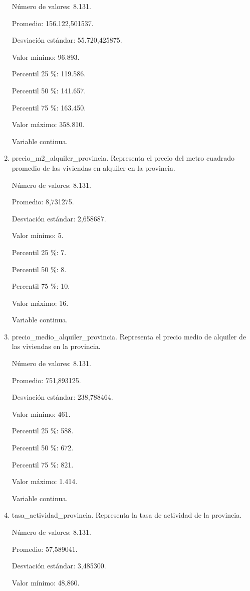 \begin{enumerate}
	Número de valores: 8.131.
	
	Promedio: 156.122,501537.
	
	Desviación estándar: 55.720,425875.
	
	Valor mínimo: 96.893.
	
	Percentil 25 \%: 119.586.
	
	Percentil 50 \%: 141.657.
	
	Percentil 75 \%: 163.450.
	
	Valor máximo: 358.810.
	
	Variable continua.

	\item precio\_m2\_alquiler\_provincia. Representa el precio del metro cuadrado promedio de las viviendas en alquiler en la provincia.
	
	Número de valores: 8.131.
	
	Promedio: 8,731275.
	
	Desviación estándar: 2,658687.
	
	Valor mínimo: 5.
	
	Percentil 25 \%: 7.
	
	Percentil 50 \%: 8.
	
	Percentil 75 \%: 10.
	
	Valor máximo: 16.
	
	Variable continua.

	\item precio\_medio\_alquiler\_provincia. Representa el precio medio de alquiler de las viviendas en la provincia.
	
	Número de valores: 8.131.
	
	Promedio: 751,893125.
	
	Desviación estándar: 238,788464.
	
	Valor mínimo: 461.
	
	Percentil 25 \%: 588.
	
	Percentil 50 \%: 672.
	
	Percentil 75 \%: 821.
	
	Valor máximo: 1.414.
	
	Variable continua.

	\item tasa\_actividad\_provincia. Representa la tasa de actividad de la provincia.
	
	Número de valores: 8.131.
	
	Promedio: 57,589041.
	
	Desviación estándar: 3,485300.
	
	Valor mínimo: 48,860.
	

\end{enumerate}
